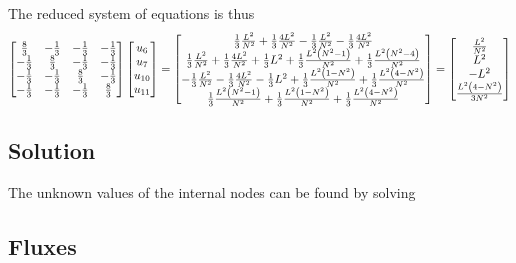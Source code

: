 The reduced system of equations is thus 
\begin{equation}
  \begin{bmatrix}
  \frac{8}{3} & -\frac{1}{3} & -\frac{1}{3} & -\frac{1}{3} \\
  -\frac{1}{3} & \frac{8}{3} & -\frac{1}{3} & -\frac{1}{3} \\
  -\frac{1}{3} & -\frac{1}{3} & \frac{8}{3} & -\frac{1}{3} \\
  -\frac{1}{3} & -\frac{1}{3} & -\frac{1}{3} & \frac{8}{3}
  \end{bmatrix}\begin{bmatrix}
    u_{6} \\ u_{7} \\ u_{10} \\ u_{11} 
  \end{bmatrix}=\begin{bmatrix}
  \frac{1}{3}\frac{L^{2}}{N^{2}}+\frac{1}{3}\frac{4L^{2}}{N^{2}}-\frac{1}{3}\frac{L^{2}}{N^{2}}-\frac{1}{3}\frac{4L^{2}}{N^{2}}\\
  \frac{1}{3}\frac{L^{2}}{N^{2}}+\frac{1}{3}\frac{4L^{2}}{N^{2}}+\frac{1}{3}L^{2}+\frac{1}{3}\frac{L^{2}\pbrac{N^{2}-1}}{N^{2}}+\frac{1}{3}\frac{L^{2}\pbrac{N^{2}-4}}{N^{2}}\\
  -\frac{1}{3}\frac{L^{2}}{N^{2}}-\frac{1}{3}\frac{4L^{2}}{N^{2}}-\frac{1}{3}L^{2}+\frac{1}{3}\frac{L^{2}\pbrac{1-N^{2}}}{N^{2}}+\frac{1}{3}\frac{L^{2}\pbrac{4-N^{2}}}{N^{2}}\\
  \frac{1}{3}\frac{L^{2}\pbrac{N^{2}-1}}{N^{2}}+\frac{1}{3}\frac{L^{2}\pbrac{1-N^{2}}}{N^{2}}+\frac{1}{3}\frac{L^{2}\pbrac{4-N^{2}}}{N^{2}}    
  \end{bmatrix}=\begin{bmatrix}
  \frac{L^{2}}{N^{2}} \\
  L^{2} \\
  -L^{2} \\
  \frac{L^{2}\pbrac{4-N^{2}}}{3N^{2}}
  \end{bmatrix}
  \label{eqn:FEMTwoDLaplaceReducedSystem}
\end{equation}

\subsection{Solution}
\label{subsec:FEMTwoDLaplaceSolution}

The unknown values of the internal nodes can be found by solving 

\subsection{Fluxes}
\label{subsec:FEMTwoDLaplaceFluxes}
